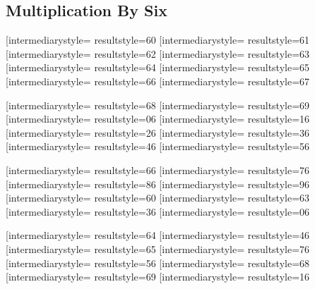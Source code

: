 \documentclass[letterpaper, 17pt]{article}
\newcommand{\white}[1]{}
\begin{document}
\begin{center}
	\section*{Multiplication By Six}

	\opmul[intermediarystyle=\white, resultstyle=\white]{6}{0}\qquad
	\opmul[intermediarystyle=\white, resultstyle=\white]{6}{1}\qquad
	\opmul[intermediarystyle=\white, resultstyle=\white]{6}{2}\qquad
	\opmul[intermediarystyle=\white, resultstyle=\white]{6}{3}\qquad
	\opmul[intermediarystyle=\white, resultstyle=\white]{6}{4}\qquad
	\opmul[intermediarystyle=\white, resultstyle=\white]{6}{5}\qquad
	\opmul[intermediarystyle=\white, resultstyle=\white]{6}{6}\qquad
	\opmul[intermediarystyle=\white, resultstyle=\white]{6}{7}\qquad

	\vspace{0.3in}

	\opmul[intermediarystyle=\white, resultstyle=\white]{6}{8}\qquad
	\opmul[intermediarystyle=\white, resultstyle=\white]{6}{9}\qquad
	\opmul[intermediarystyle=\white, resultstyle=\white]{0}{6}\qquad
	\opmul[intermediarystyle=\white, resultstyle=\white]{1}{6}\qquad
	\opmul[intermediarystyle=\white, resultstyle=\white]{2}{6}\qquad
	\opmul[intermediarystyle=\white, resultstyle=\white]{3}{6}\qquad
	\opmul[intermediarystyle=\white, resultstyle=\white]{4}{6}\qquad
	\opmul[intermediarystyle=\white, resultstyle=\white]{5}{6}\qquad

	\vspace{0.3in}

	\opmul[intermediarystyle=\white, resultstyle=\white]{6}{6}\qquad
	\opmul[intermediarystyle=\white, resultstyle=\white]{7}{6}\qquad
	\opmul[intermediarystyle=\white, resultstyle=\white]{8}{6}\qquad
	\opmul[intermediarystyle=\white, resultstyle=\white]{9}{6}\qquad
	\opmul[intermediarystyle=\white, resultstyle=\white]{6}{0}\qquad
	\opmul[intermediarystyle=\white, resultstyle=\white]{6}{3}\qquad
	\opmul[intermediarystyle=\white, resultstyle=\white]{3}{6}\qquad
	\opmul[intermediarystyle=\white, resultstyle=\white]{0}{6}\qquad

	\vspace{0.3in}

	\opmul[intermediarystyle=\white, resultstyle=\white]{6}{4}\qquad
	\opmul[intermediarystyle=\white, resultstyle=\white]{4}{6}\qquad
	\opmul[intermediarystyle=\white, resultstyle=\white]{6}{5}\qquad
	\opmul[intermediarystyle=\white, resultstyle=\white]{7}{6}\qquad
	\opmul[intermediarystyle=\white, resultstyle=\white]{5}{6}\qquad
	\opmul[intermediarystyle=\white, resultstyle=\white]{6}{8}\qquad
	\opmul[intermediarystyle=\white, resultstyle=\white]{6}{9}\qquad
	\opmul[intermediarystyle=\white, resultstyle=\white]{1}{6}\qquad


\end{center}
\end{document}
